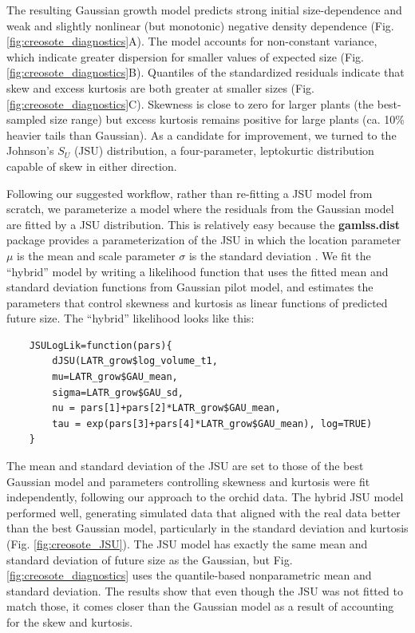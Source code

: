\documentclass[12pt]{article}
\begin{document}
The resulting Gaussian growth model predicts strong initial size-dependence and weak and slightly nonlinear (but monotonic) negative density dependence (Fig. \ref{fig:creosote_diagnostics}A). 
The model accounts for non-constant variance, which indicate greater dispersion for smaller values of expected size (Fig. \ref{fig:creosote_diagnostics}B).  
Quantiles of the standardized residuals indicate that skew and excess kurtosis are both greater at smaller sizes (Fig. \ref{fig:creosote_diagnostics}C).
Skewness is close to zero for larger plants (the best-sampled size range) but excess kurtosis remains positive for large plants (ca. 10\% heavier tails than Gaussian). 
As a candidate for improvement, we turned to the Johnson's $S_{U}$ (JSU) distribution, a four-parameter, leptokurtic distribution capable of skew in either direction. 

Following our suggested workflow, rather than re-fitting a JSU model from scratch, we parameterize a model where the residuals from the Gaussian model are fitted by a JSU distribution. 
This is relatively easy because the \textbf{gamlss.dist} package provides a parameterization of the JSU in which the location parameter $\mu$ is the mean and scale parameter $\sigma$ is the standard deviation \citep{rigby2019distributions}. 
We fit the ``hybrid'' model by writing a likelihood function that uses the fitted mean and standard deviation functions from Gaussian pilot model, and estimates the parameters that control skewness and kurtosis as linear functions of predicted future size.   
The ``hybrid'' likelihood looks like this:
\begin{lstlisting}
	JSULogLik=function(pars){
		dJSU(LATR_grow$log_volume_t1, 
		mu=LATR_grow$GAU_mean,
		sigma=LATR_grow$GAU_sd,
		nu = pars[1]+pars[2]*LATR_grow$GAU_mean,
		tau = exp(pars[3]+pars[4]*LATR_grow$GAU_mean), log=TRUE)
	}
\end{lstlisting}

The mean and standard deviation of the JSU are set to those of the best Gaussian model and parameters controlling skewness and kurtosis were fit independently, following our approach to the orchid data. 
The hybrid JSU model performed well, generating simulated data that aligned with the real data better than the best Gaussian model, particularly in the standard deviation and kurtosis (Fig. \ref{fig:creosote_JSU}). 
The JSU model has exactly the same mean and standard deviation of future size as the Gaussian, but Fig. \ref{fig:creosote_diagnostics} uses the quantile-based nonparametric mean and standard deviation. 
The results show that even though the JSU was not fitted to match those, it comes closer than the Gaussian model as a result of accounting for the skew and kurtosis.
\end{document}
